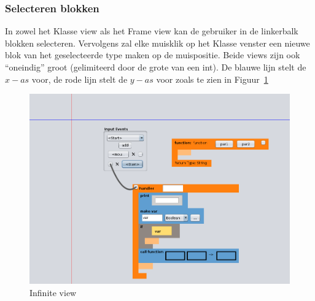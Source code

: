\documentclass[]{article}
\begin{document}
\subsubsection{Selecteren blokken}
In zowel het Klasse view als het Frame view kan de gebruiker in de linkerbalk blokken selecteren. Vervolgens zal elke muisklik op het Klasse venster een nieuwe blok van het geselecteerde type maken op de muispositie. Beide views zijn ook ``oneindig'' groot (gelimiteerd door de grote van een int). De blauwe lijn stelt de $x-as$ voor, de rode lijn stelt de $y-as$ voor zoals te zien in Figuur~\ref{infinite}
\begin{figure}[H]
\centering
\includegraphics[width=1.1\textwidth]{./Functionaliteit/infinite.png}
\caption{Infinite view}
\label{infinite}
\end{figure}
\end{document}
